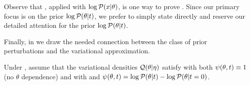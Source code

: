 Observe that , applied with $\log \mathcal{P}(x \vert \theta)$, is
one way to prove .  Since our primary focus
is on the prior $\log \mathcal{P}(\theta \vert t)$, we prefer to simply state
 directly and reserve our detailed attention
for the prior $\log \mathcal{P}(\theta \vert t)$.

Finally, in  we draw the needed connection between the
class of prior perturbations and the variational approximation.

\begin{assu}
%
Under , assume that the variational densities $\mathcal{Q}(\theta \vert
\eta)$ satisfy  with both $\psi(\theta, t) \equiv 1$ (no
$\theta$ dependence) and with and $\psi(\theta, t) = \log \mathcal{P}(\theta \vert t) -
\log \mathcal{P}(\theta \vert t=0)$.
%
\end{assu}


